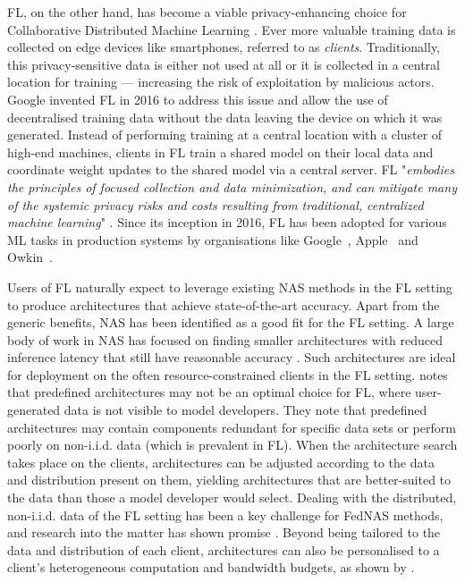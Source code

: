 FL, on the other hand, has become a viable privacy-enhancing choice for Collaborative Distributed Machine Learning \cite{cdml_2024}. Ever more valuable training data is collected on edge devices like smartphones, referred to as \textit{clients}. Traditionally, this privacy-sensitive data is either not used at all or it is collected in a central location for training — increasing the risk of exploitation by malicious actors. Google invented FL in 2016 to address this issue and allow the use of decentralised training data without the data leaving the device on which it was generated. Instead of performing training at a central location with a cluster of high-end machines, clients in FL train a shared model on their local data and coordinate weight updates to the shared model via a central server. FL "\textit{embodies the principles of focused collection and data minimization, and can mitigate many of the systemic privacy risks and costs resulting from traditional, centralized machine learning}" \cite{fl_advances_and_open_problems_2021}. Since its inception in 2016, FL has been adopted for various ML tasks in production systems by organisations like Google~\cite{gboard_fl_2018}, Apple~\cite{apple_fl_case_study_2025} and Owkin~\cite{owkin_fl_drug_discovery_in_prod_2022}.

Users of FL naturally expect to leverage existing NAS methods in the FL setting to produce architectures that achieve state-of-the-art accuracy. Apart from the generic benefits, NAS has been identified as a good fit for the FL setting. A large body of work in NAS has focused on finding smaller architectures with reduced inference latency that still have reasonable accuracy \cite{nas_1000_papers_2023}. Such architectures are ideal for deployment on the often resource-constrained clients in the FL setting. \cite{fl_advances_and_open_problems_2021} notes that predefined architectures may not be an optimal choice for FL, where user-generated data is not visible to model developers. They note that predefined architectures may contain components redundant for specific data sets or perform poorly on non-i.i.d. data (which is prevalent in FL). When the architecture search takes place on the clients, architectures can be adjusted according to the data and distribution present on them, yielding architectures that are better-suited to the data than those a model developer would select. Dealing with the distributed, non-i.i.d. data of the FL setting has been a key challenge for FedNAS methods, and research into the matter has shown promise \cite{fednas_2021} \cite{rl_fednas_2021} \cite{fedoras_2022} \cite{finch_2024} \cite{peaches_2024}. Beyond being tailored to the data and distribution of each client, architectures can also be personalised to a client's heterogeneous computation and bandwidth budgets, as shown by \cite{superfednas_2024} \cite{fedoras_2022} \cite{perfedrlnas_2024} \cite{decnas_2022}. 


